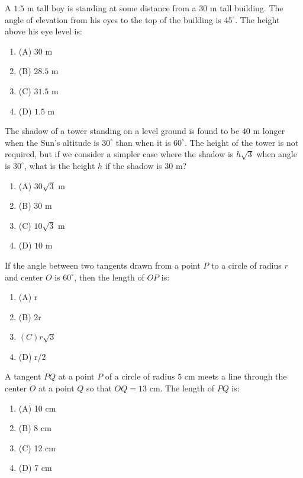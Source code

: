 \documentclass[12pt,a4paper]{exam}
\begin{document}
\begin{questions}
\question[1] A $1.5$ m tall boy is standing at some distance from a $30$ m tall building. The angle of elevation from his eyes to the top of the building is $45^\circ$. The height above his eye level is:
\begin{enumerate}[label=(\Alph*)]
  \item (A) $30$ m
  \item (B) $28.5$ m
  \item (C) $31.5$ m
  \item (D) $1.5$ m
\end{enumerate}
\vspace{0.15cm}

\question[1] The shadow of a tower standing on a level ground is found to be $40$ m longer when the Sun's altitude is $30^\circ$ than when it is $60^\circ$. The height of the tower is not required, but if we consider a simpler case where the shadow is $h\sqrt{3}$ when angle is $30^\circ$, what is the height $h$ if the shadow is $30$ m?
\begin{enumerate}[label=(\Alph*)]
  \item (A) $30\sqrt{3}$ m
  \item (B) $30$ m
  \item (C) $10\sqrt{3}$ m
  \item (D) $10$ m
\end{enumerate}
\vspace{0.15cm}

\question[1] If the angle between two tangents drawn from a point $P$ to a circle of radius $r$ and center $O$ is $60^\circ$, then the length of $OP$ is:
\begin{enumerate}[label=(\Alph*)]
  \item (A) r
  \item (B) 2r
  \item $(C) r\sqrt{3}$
  \item (D) r/2
\end{enumerate}
\vspace{0.15cm}

\question[1] A tangent $PQ$ at a point $P$ of a circle of radius $5 \text{ cm}$ meets a line through the center $O$ at a point $Q$ so that $OQ = 13 \text{ cm}$. The length of $PQ$ is:
\begin{enumerate}[label=(\Alph*)]
  \item (A) 10 cm
  \item (B) 8 cm
  \item (C) 12 cm
  \item (D) 7 cm
\end{enumerate}
\vspace{0.15cm}


\end{questions}
\end{document}
